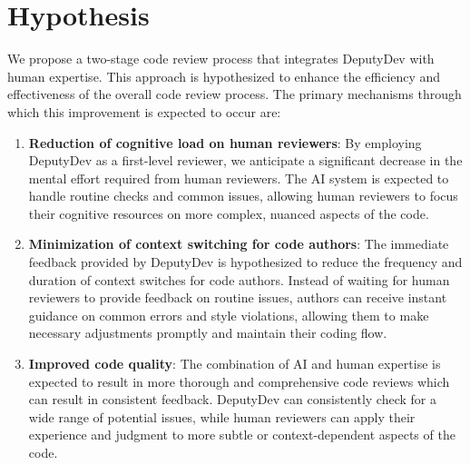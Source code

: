 \section{Hypothesis}
We propose a two-stage code review process that integrates DeputyDev with human expertise. This approach is hypothesized to enhance the efficiency and effectiveness of the overall code review process. The primary mechanisms through which this improvement is expected to occur are:

\begin{enumerate}
    \item \textbf{Reduction of cognitive load on human reviewers}: By employing DeputyDev as a first-level reviewer, we anticipate a significant decrease in the mental effort required from human reviewers. The AI system is expected to handle routine checks and common issues, allowing human reviewers to focus their cognitive resources on more complex, nuanced aspects of the code.
    
    \item \textbf{Minimization of context switching for code authors}: The immediate feedback provided by DeputyDev is hypothesized to reduce the frequency and duration of context switches for code authors. Instead of waiting for human reviewers to provide feedback on routine issues, authors can receive instant guidance on common errors and style violations, allowing them to make necessary adjustments promptly and maintain their coding flow.
    
    \item \textbf{Improved code quality}: The combination of AI and human expertise is expected to result in more thorough and comprehensive code reviews which can result in consistent feedback. DeputyDev can consistently check for a wide range of potential issues, while human reviewers can apply their experience and judgment to more subtle or context-dependent aspects of the code.
\end{enumerate}